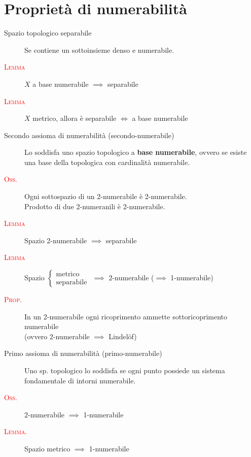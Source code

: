 \documentclass[a4paper,10pt]{article}
\newcommand{\myth}{\normalfont \scshape \textcolor{red}}
\theoremstyle{remark}
\theoremstyle{definition}
\begin{document}
\section*{Proprietà di numerabilità}
\begin{description}
    \item[Spazio topologico separabile] Se contiene un sottoinsieme denso e numerabile.
    \item[\myth{Lemma}] $X$ a base numerabile $\implies$ separabile
    \item[\myth{Lemma}] $X$ metrico, allora è separabile $\iff$ a base numerabile
    \item[Secondo assioma di numerabilità (secondo-numerabile)] Lo soddisfa uno spazio topologico a \textbf{base numerabile}, ovvero se esiste una base della topologica con cardinalità numerabile.
    \item[\myth{Oss.}] Ogni sottospazio di un 2-numerabile è 2-numerabile.\\
    Prodotto di due 2-numeranili è 2-numerabile.
    \item[\myth{Lemma}] Spazio 2-numerabile $\implies$ separabile
    \item[\myth{Lemma}] Spazio 
    $\begin{cases}
        \mbox{metrico} \\
        \mbox{separabile}
    \end{cases}$
    $\implies$ 2-numerabile ($\implies$ 1-numerabile)
    \item[\myth{Prop.}] In un 2-numerabile ogni ricoprimento ammette sottoricoprimento  numerabile \\ 
    (ovvero 2-numerabile $\implies$ Lindelöf)
    \item[Primo assioma di numerabilità (primo-numerabile)] Uno sp. topologico lo soddisfa se ogni punto possiede un sistema fondamentale di intorni numerabile.
    \item[\myth{Oss.}] 2-numerabile $\implies$ 1-numerabile
    \item[\myth{Lemma.}] Spazio metrico $\implies$ 1-numerabile
\end{description}
\end{document}
